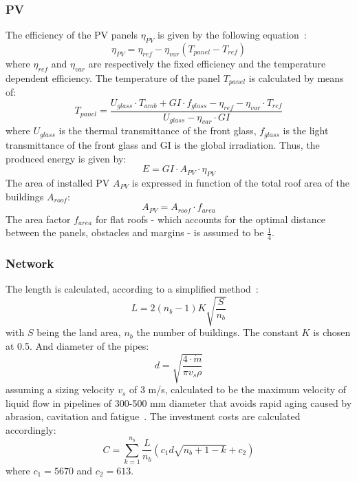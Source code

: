 \documentclass{article}
\begin{document}
\subsubsection{PV}\label{sss:pv}
The efficiency of the PV panels $\eta_{PV}$ is given by the following equation~\cite{stadlerModelbasedOptimizationDistributed2016}:
\begin{equation}
	\eta_{PV} = \eta_{ref} - \eta_{var} (T_{panel}-T_{ref})
\end{equation}
where $\eta_{ref}$ and $\eta_{var}$ are respectively the fixed efficiency and the temperature dependent efficiency. The temperature of the panel $T_{panel}$ is calculated by means of:
\begin{equation}
	T_{panel} = \frac{U_{glass}\cdot T_{amb} + GI \cdot f_{glass}-\eta_{ref} - \eta_{var} \cdot T_{ref}}{U_{glass}-\eta_{var} \cdot GI}
\end{equation}
where $U_{glass}$ is the thermal transmittance of the front glass, $f_{glass}$ is the light transmittance of the front glass and GI is the global irradiation.
Thus, the produced energy is given by:
\begin{equation}
	E = GI \cdot A_{PV} \cdot  \eta_{PV}
\end{equation}
The area of installed PV $A_{PV}$ is expressed in function of the total roof area of the buildings $A_{roof}$:
\begin{equation}
	A_{PV} = A_{roof} \cdot f_{area}
\end{equation}
The area factor $f_{area}$ for flat roofs - which accounts for the optimal distance between the panels, obstacles and margins - is assumed to be $\frac{1}{4}$.

\subsubsection{Network}\label{sss:net}
The length is calculated, according to a simplified method~\cite{girardinEnerGisGeographicalInformation2010}:
\begin{equation}
L = 2(n_{b}-1)K\sqrt{\frac{S}{n_{b}}}
\end{equation}
with $S$ being the land area, $n_{b}$ the number of buildings. The constant $K$ is chosen at 0.5.
And diameter of the pipes:
\begin{equation}
d = \sqrt{\frac{4\cdot \dot{m}}{\pi v_{s} \rho}}
\end{equation}
assuming a sizing velocity $v_{s}$ of 3 m/s, calculated to be the maximum velocity of liquid flow in pipelines of 300-500 mm diameter that avoids rapid aging caused by abrasion, cavitation and fatigue~\cite{henchozPerformanceProfitabilityPerspectives2015}.
The investment costs are calculated accordingly:
\begin{equation}
C = \sum_{k=1}^{n_{b}} \frac{L}{n_{b}} (c_{1} d \sqrt{n_{b}+1-k} + c_{2})
\end{equation}
where $c_{1} =5670 $ and $c_{2} = 613 $.\\
\end{document}
